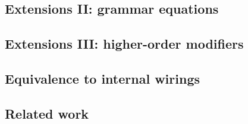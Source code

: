 \begin{example}

\end{example}

\subsection{Extensions II: grammar equations}


\begin{example}

\end{example}


\begin{example}

\end{example}


\begin{example}

\end{example}

\subsection{Extensions III: higher-order modifiers}


\begin{example}

\end{example}


\begin{example}

\end{example}

\subsection{Equivalence to internal wirings}

\subsection{Related work}